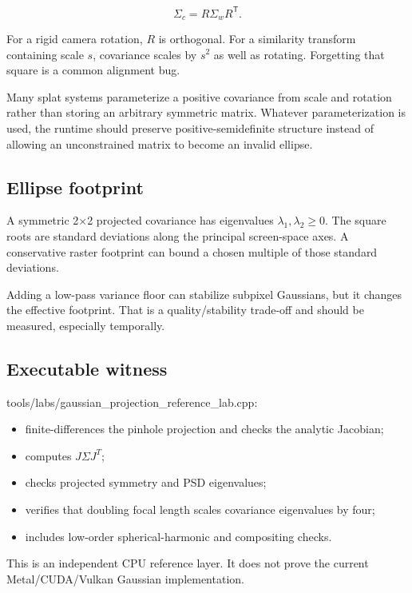 \[
\Sigma_c=R\Sigma_wR^{\mathsf T}.
\]

For a rigid camera rotation, \(R\) is orthogonal. For a similarity transform containing scale \(s\), covariance scales by \(s^2\) as well as rotating. Forgetting that square is a common alignment bug.

Many splat systems parameterize a positive covariance from scale and rotation rather than storing an arbitrary symmetric matrix. Whatever parameterization is used, the runtime should preserve positive-semidefinite structure instead of allowing an unconstrained matrix to become an invalid ellipse.

\subsection{Ellipse footprint}\label{appendix-24269cb6977c-ellipse-footprint}

A symmetric 2×2 projected covariance has eigenvalues \(\lambda_1,\lambda_2\ge0\). The square roots are standard deviations along the principal screen-space axes. A conservative raster footprint can bound a chosen multiple of those standard deviations.

Adding a low-pass variance floor can stabilize subpixel Gaussians, but it changes the effective footprint. That is a quality/stability trade-off and should be measured, especially temporally.

\subsection{Executable witness}\label{appendix-24269cb6977c-executable-witness}

tools/labs/gaussian\_projection\_reference\_lab.cpp:

\begin{itemize}
\tightlist
\item
  finite-differences the pinhole projection and checks the analytic Jacobian;
\item
  computes \(J\Sigma J^T\);
\item
  checks projected symmetry and PSD eigenvalues;
\item
  verifies that doubling focal length scales covariance eigenvalues by four;
\item
  includes low-order spherical-harmonic and compositing checks.
\end{itemize}

This is an independent CPU reference layer. It does not prove the current Metal/CUDA/Vulkan Gaussian implementation.

